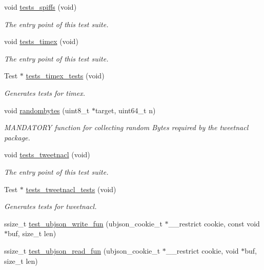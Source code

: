 \begin{DoxyCompactItemize}
void \hyperlink{group__unittests_ga80de15b6e1bf2cc394a940d69830d042}{tests\+\_\+spiffs} (void)
\begin{DoxyCompactList}\small\item\em The entry point of this test suite. \end{DoxyCompactList}\item 
void \hyperlink{group__unittests_gad66683ae3365683aba4d469e07ce6799}{tests\+\_\+timex} (void)
\begin{DoxyCompactList}\small\item\em The entry point of this test suite. \end{DoxyCompactList}\item 
Test $\ast$ \hyperlink{group__unittests_ga8e6c61c50f2b2580f16effebba8a7e83}{tests\+\_\+timex\+\_\+tests} (void)
\begin{DoxyCompactList}\small\item\em Generates tests for timex. \end{DoxyCompactList}\item 
void \hyperlink{group__unittests_gad3aa6e3b3ad43afce8349ec384d40338}{randombytes} (uint8\+\_\+t $\ast$target, uint64\+\_\+t n)
\begin{DoxyCompactList}\small\item\em M\+A\+N\+D\+A\+T\+O\+RY function for collecting random Bytes required by the tweetnacl package. \end{DoxyCompactList}\item 
void \hyperlink{group__unittests_gaa48af13c9647d85886796d6c526776a1}{tests\+\_\+tweetnacl} (void)
\begin{DoxyCompactList}\small\item\em The entry point of this test suite. \end{DoxyCompactList}\item 
Test $\ast$ \hyperlink{group__unittests_ga9eef4348cd35bd34bac6ef153930eca1}{tests\+\_\+tweetnacl\+\_\+tests} (void)
\begin{DoxyCompactList}\small\item\em Generates tests for tweetnacl. \end{DoxyCompactList}\item 
ssize\+\_\+t \hyperlink{group__unittests_ga53e6c1e17347b7fa039be7245a0c76bf}{test\+\_\+ubjson\+\_\+write\+\_\+fun} (ubjson\+\_\+cookie\+\_\+t $\ast$\+\_\+\+\_\+restrict cookie, const void $\ast$buf, size\+\_\+t len)
\item 
ssize\+\_\+t \hyperlink{group__unittests_ga8035b33fdb669d1d31033f41e4d7e291}{test\+\_\+ubjson\+\_\+read\+\_\+fun} (ubjson\+\_\+cookie\+\_\+t $\ast$\+\_\+\+\_\+restrict cookie, void $\ast$buf, size\+\_\+t len)

\end{DoxyCompactItemize}
